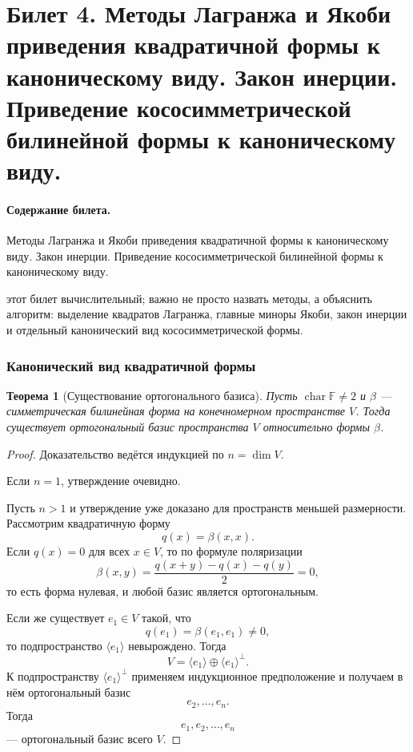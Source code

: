 \documentclass[12pt,a4paper]{article}
\theoremstyle{definition}
\theoremstyle{plain}
\newtheorem{theorem}[definition]{Теорема}
\theoremstyle{remark}
\newenvironment{planadd}{\begin{planbox}}{\end{planbox}}
\newcommand{\F}{\mathbb{F}}
\begin{document}
\clearpage

\section{Билет 4. Методы Лагранжа и Якоби приведения квадратичной формы к каноническому виду. Закон инерции. Приведение кососимметрической билинейной формы к каноническому виду.}

\paragraph{Содержание билета.} Методы Лагранжа и Якоби приведения квадратичной формы к каноническому виду. Закон инерции. Приведение кососимметрической билинейной формы к каноническому виду.

\begin{planadd}

этот билет вычислительный; важно не просто назвать методы, а объяснить алгоритм: выделение квадратов Лагранжа, главные миноры Якоби, закон инерции и отдельный канонический вид кососимметрической формы.

\end{planadd}

\subsubsection{Канонический вид квадратичной формы}


\begin{theorem}[Существование ортогонального базиса]
Пусть $\operatorname{char}\F\ne2$ и $\beta$ --- симметрическая билинейная форма на конечномерном пространстве $V$.
Тогда существует ортогональный базис пространства $V$ относительно формы $\beta$.
\end{theorem}

\begin{proof}
Доказательство ведётся индукцией по $n=\dim V$.

Если $n=1$, утверждение очевидно.

Пусть $n>1$ и утверждение уже доказано для пространств меньшей размерности.
Рассмотрим квадратичную форму
\[
    q(x)=\beta(x,x).
\]
Если $q(x)=0$ для всех $x\in V$, то по формуле поляризации
\[
    \beta(x,y)=\frac{q(x+y)-q(x)-q(y)}{2}=0,
\]
то есть форма нулевая, и любой базис является ортогональным.

Если же существует $e_1\in V$ такой, что
\[
    q(e_1)=\beta(e_1,e_1)\ne0,
\]
то подпространство $\langle e_1\rangle$ невырождено. Тогда
\[
    V=\langle e_1\rangle\oplus \langle e_1\rangle^\perp.
\]
К подпространству $\langle e_1\rangle^\perp$ применяем индукционное предположение и получаем в нём ортогональный базис
\[
    e_2,\ldots,e_n.
\]
Тогда
\[
    e_1,e_2,\ldots,e_n
\]
--- ортогональный базис всего $V$.
\end{proof}
\end{document}
